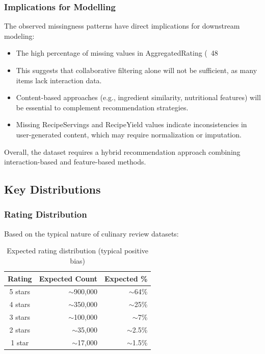 \documentclass[11pt,a4paper]{article}
\begin{document}
\subsubsection{Implications for Modelling}
The observed missingness patterns have direct implications for downstream modeling:
\begin{itemize}
    \item The high percentage of missing values in AggregatedRating (~48%
    \item This suggests that collaborative filtering alone will not be sufficient, as many items lack interaction data.
    \item Content-based approaches (e.g., ingredient similarity, nutritional features) will be essential to complement recommendation strategies.
    \item Missing RecipeServings and RecipeYield values indicate inconsistencies in user-generated content, which may require normalization or imputation.
\end{itemize}
Overall, the dataset requires a hybrid recommendation approach combining interaction-based and feature-based methods.

\subsection{Key Distributions}

\subsubsection{Rating Distribution}

Based on the typical nature of culinary review datasets:

\begin{table}[H]
\centering
\begin{tabular}{crr}
\toprule
\textbf{Rating} & \textbf{Expected Count} & \textbf{Expected \%} \\
\midrule
5 stars & $\sim$900,000 & $\sim$64\% \\
4 stars & $\sim$350,000 & $\sim$25\% \\
3 stars & $\sim$100,000 & $\sim$7\% \\
2 stars & $\sim$35,000 & $\sim$2.5\% \\
1 star & $\sim$17,000 & $\sim$1.5\% \\
\bottomrule
\end{tabular}
\caption{Expected rating distribution (typical positive bias)}
\label{tab:rating_dist}
\end{table}
\end{document}

